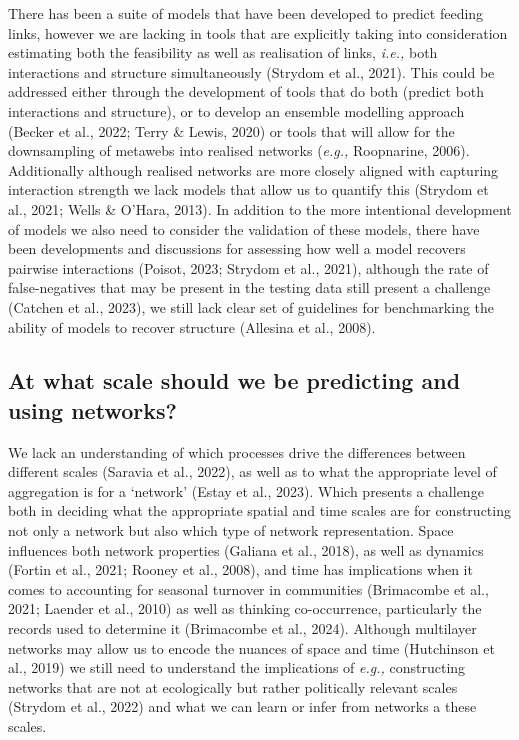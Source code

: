 \documentclass[
]{article}
\begin{document}
There has been a suite of models that have been developed to predict
feeding links, however we are lacking in tools that are explicitly
taking into consideration estimating both the feasibility as well as
realisation of links, \emph{i.e.,} both interactions and structure
simultaneously (Strydom et al., 2021). This could be addressed either
through the development of tools that do both (predict both interactions
and structure), or to develop an ensemble modelling approach (Becker et
al., 2022; Terry \& Lewis, 2020) or tools that will allow for the
downsampling of metawebs into realised networks (\emph{e.g.,}
Roopnarine, 2006). Additionally although realised networks are more
closely aligned with capturing interaction strength we lack models that
allow us to quantify this (Strydom et al., 2021; Wells \& O'Hara, 2013).
In addition to the more intentional development of models we also need
to consider the validation of these models, there have been developments
and discussions for assessing how well a model recovers pairwise
interactions (Poisot, 2023; Strydom et al., 2021), although the rate of
false-negatives that may be present in the testing data still present a
challenge (Catchen et al., 2023), we still lack clear set of guidelines
for benchmarking the ability of models to recover structure (Allesina et
al., 2008).

\subsection{At what scale should we be predicting and using
networks?}\label{at-what-scale-should-we-be-predicting-and-using-networks}

We lack an understanding of which processes drive the differences
between different scales (Saravia et al., 2022), as well as to what the
appropriate level of aggregation is for a `network' (Estay et al.,
2023). Which presents a challenge both in deciding what the appropriate
spatial and time scales are for constructing not only a network but also
which type of network representation. Space influences both network
properties (Galiana et al., 2018), as well as dynamics (Fortin et al.,
2021; Rooney et al., 2008), and time has implications when it comes to
accounting for seasonal turnover in communities (Brimacombe et al.,
2021; Laender et al., 2010) as well as thinking co-occurrence,
particularly the records used to determine it (Brimacombe et al., 2024).
Although multilayer networks may allow us to encode the nuances of space
and time (Hutchinson et al., 2019) we still need to understand the
implications of \emph{e.g.,} constructing networks that are not at
ecologically but rather politically relevant scales (Strydom et al.,
2022) and what we can learn or infer from networks a these scales.
\end{document}
